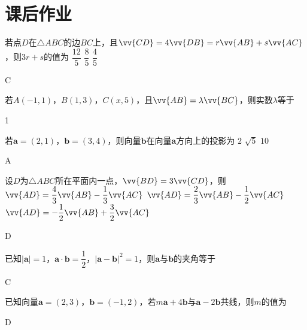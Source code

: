 \newpage
\section{课后作业}
\begin{exercise}
  \item%
    若点$D$在$\triangle{ABC}$的边$BC$上，且$\vv{CD}=4\vv{DB}=r\vv{AB}+s\vv{AC}$，则$3r+s$的值为\xz
     {$\dfrac{12}5$}
     {$\dfrac{8}5$}
     {$\dfrac{4}5$}
    \begin{answer}
      C
    \end{answer}
  \item%
    若$A(-1,1)$，$B(1,3)$，$C(x,5)$，且$\vv{AB}=\lambda\vv{BC}$，则实数$\lambda$等于\xz
    \begin{answer}
      1
    \end{answer}
  \item%
    若$\bm a=(2,1)$，$\bm b=(3,4)$，则向量$\bm b$在向量$\bm a$方向上的投影为\xz
     {$2$}
     {$\sqrt5$}
     {$10$}
    \begin{answer}
      A
    \end{answer}
  \item%
    设$D$为$\triangle{ABC}$所在平面内一点，$\vv{BD}=3\vv{CD}$，则\xz
     {$\vv{AD}=\dfrac43\vv{AB}-\dfrac13\vv{AC}$}
     {$\vv{AD}=\dfrac23\vv{AB}-\dfrac12\vv{AC}$}
     {$\vv{AD}=-\dfrac12\vv{AB}+\dfrac32\vv{AC}$}
    \begin{answer}
      D
    \end{answer}
  \item%
    已知$|\bm a|=1$，$\bm a\cdot\bm b=\dfrac12$，$|\bm a-\bm b|^2=1$，则$\bm a$与$\bm b$的夹角等于\xz
    \xx{30\degree}{45\degree}{60\degree}{120\degree}
    \begin{answer}
      C
    \end{answer}
  \item%
    已知向量$\bm a=(2,3)$，$\bm b=(-1,2)$，若$m\bm a+4\bm b$与$\bm a-2\bm b$共线，则$m$的值为\xz
    \begin{answer}
      D
    \end{answer}
  \item%

\end{exercise}
